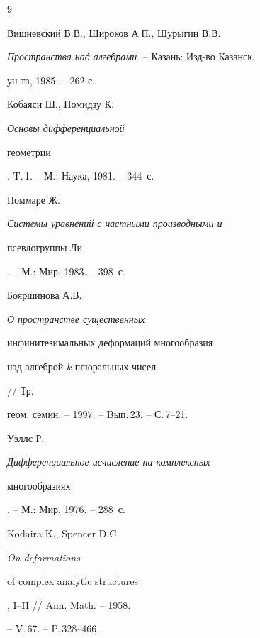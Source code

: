 \begin{thebibliography}{9}







Вишневский В.В., Широков А.П., Шурыгин В.В.


{\em Пространства над алгебрами}. -- Казань: Изд-во Казанск.


ун-та, 1985. -- 262 с.







Кобаяси Ш., Номидзу К. {\em Основы дифференциальной


геометрии}. T.\,1. -- М.: Наука, 1981. -- 344~с.







Поммаре Ж. {\em Системы уравнений с частными производными и


псевдогруппы Ли}. -- М.: Мир, 1983. -- 398~с.







Бояршинова А.В. {\em О пространстве существенных


инфинитезимальных деформаций многообразия


над алгеброй $k$-плюральных чисел} // Тр.


геом. семин. -- 1997. -- Bып.\,23. -- С.\,7--21.







Уэллс Р. {\em Дифференциальное исчисление на комплексных


многообразиях}. -- М.: Мир, 1976. -- 288~с.







Kodaira K., Spencer D.C. {\em On deformations


of complex analytic structures}, I--II // Ann. Math. -- 1958.


-- V.\,67. -- P.\,328--466.





\end{thebibliography}





\vskip 2cm












\label{end}








